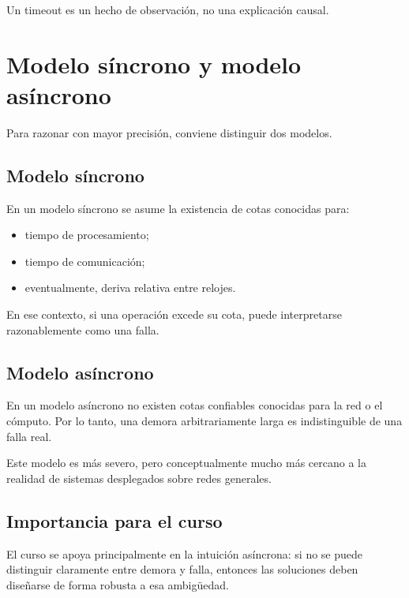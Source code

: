 \documentclass[variant=apuntes,cover=institutional,mode=screen]{ua-engineering-v6-article}
\begin{document}
\begin{uawarn}
Un timeout es un hecho de observación, no una explicación causal.
\end{uawarn}

\section{Modelo síncrono y modelo asíncrono}\label{sec:modelo-sincrono-y-modelo-asincrono}

Para razonar con mayor precisión, conviene distinguir dos modelos.

\subsection{Modelo síncrono}\label{subsec:modelo-sincrono}

En un modelo síncrono se asume la existencia de cotas conocidas para:

\begin{itemize}
\item tiempo de procesamiento;
\item tiempo de comunicación;
\item eventualmente, deriva relativa entre relojes.
\end{itemize}

En ese contexto, si una operación excede su cota, puede interpretarse razonablemente como una falla.

\subsection{Modelo asíncrono}\label{subsec:modelo-asincrono}

En un modelo asíncrono no existen cotas confiables conocidas para la red o el cómputo.
Por lo tanto, una demora arbitrariamente larga es indistinguible de una falla real.

Este modelo es más severo, pero conceptualmente mucho más cercano a la realidad de sistemas desplegados sobre redes generales.

\subsection{Importancia para el curso}\label{subsec:importancia-para-el-curso}

El curso se apoya principalmente en la intuición asíncrona: si no se puede distinguir claramente entre demora y falla, entonces las soluciones deben diseñarse de forma robusta a esa ambigüedad.
\end{document}
